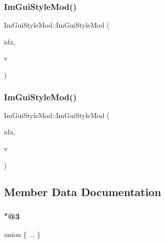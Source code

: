 \subsubsection{\texorpdfstring{Im\+Gui\+Style\+Mod()}{ImGuiStyleMod()}\hspace{0.1cm}{\footnotesize\ttfamily [2/3]}}
{\footnotesize\ttfamily Im\+Gui\+Style\+Mod\+::\+Im\+Gui\+Style\+Mod (\begin{DoxyParamCaption}\item[{\mbox{\hyperlink{imgui_8h_ac919acabce24faae590e295b424874ca}{Im\+Gui\+Style\+Var}}}]{idx,  }\item[{float}]{v }\end{DoxyParamCaption})\hspace{0.3cm}{\ttfamily [inline]}}

\mbox{\label{struct_im_gui_style_mod_a28647cc4ab8b95b8ee30e0fc7401ae07}} 
\subsubsection{\texorpdfstring{Im\+Gui\+Style\+Mod()}{ImGuiStyleMod()}\hspace{0.1cm}{\footnotesize\ttfamily [3/3]}}
{\footnotesize\ttfamily Im\+Gui\+Style\+Mod\+::\+Im\+Gui\+Style\+Mod (\begin{DoxyParamCaption}\item[{\mbox{\hyperlink{imgui_8h_ac919acabce24faae590e295b424874ca}{Im\+Gui\+Style\+Var}}}]{idx,  }\item[{\mbox{\hyperlink{struct_im_vec2}{Im\+Vec2}}}]{v }\end{DoxyParamCaption})\hspace{0.3cm}{\ttfamily [inline]}}



\subsection{Member Data Documentation}
\mbox{\label{struct_im_gui_style_mod_aecd20df739984d80e5a90a7c12927fd1}} 
\subsubsection{\texorpdfstring{"@3}{@3}}
{\footnotesize\ttfamily union \{ ... \} }

